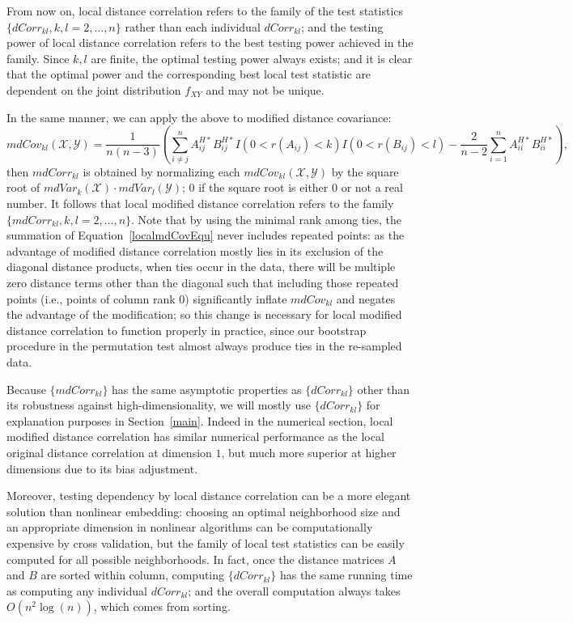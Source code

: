 \documentclass[11pt]{article}
\begin{document}
From now on, local distance correlation refers to the family of the test statistics $\{dCorr_{kl}, k,l=2,\ldots,n\}$ rather than each individual $dCorr_{kl}$; and the testing power of local distance correlation refers to the best testing power achieved in the family. Since $k,l$ are finite, the optimal testing power always exists; and it is clear that the optimal power and the corresponding best local test statistic are dependent on the joint distribution $f_{XY}$ and may not be unique.

In the same manner, we can apply the above to modified distance covariance:
\begin{equation}
\label{localmdCovEqu}
mdCov_{kl}(\mathcal{X},\mathcal{Y}) =\frac{1}{n(n-3)}(\sum_{i \neq j}^{n}A^{H*}_{ij}B^{H*}_{ij}I(0<r(A_{ij})<k)I(0<r(B_{ij})<l)-\frac{2}{n-2}\sum_{i=1}^{n}A^{H*}_{ii}B^{H*}_{ii}), 
\end{equation}
then $mdCorr_{kl}$ is obtained by normalizing each $mdCov_{kl}(\mathcal{X},\mathcal{Y})$ by the square root of $mdVar_{k}(\mathcal{X}) \cdot mdVar_{l}(\mathcal{Y})$; $0$ if the square root is either $0$ or not a real number. It follows that local modified distance correlation refers to the family $\{mdCorr_{kl}, k,l=2,\ldots,n\}$. Note that by using the minimal rank among ties, the summation of Equation~\eqref{localmdCovEqu} never includes repeated points: as the advantage of modified distance correlation mostly lies in its exclusion of the diagonal distance products, when ties occur in the data, there will be multiple zero distance terms other than the diagonal such that including those repeated points (i.e., points of column rank $0$) significantly inflate $mdCov_{kl}$ and negates the advantage of the modification; so this change is necessary for local modified distance correlation to function properly in practice, since our bootstrap procedure in the permutation test almost always produce ties in the re-sampled data.

Because $\{mdCorr_{kl}\}$ has the same asymptotic properties as $\{dCorr_{kl}\}$ other than its robustness against high-dimensionality, we will mostly use $\{dCorr_{kl}\}$ for explanation purposes in Section~\ref{main}. Indeed in the numerical section, local modified distance correlation has similar numerical performance as the local original distance correlation at dimension $1$, but much more superior at higher dimensions due to its bias adjustment.


Moreover, testing dependency by local distance correlation can be a more elegant solution than nonlinear embedding: choosing an optimal neighborhood size and an appropriate dimension in nonlinear algorithms can be computationally expensive by cross validation, but the family of local test statistics can be easily computed for all possible neighborhoods. In fact, once the distance matrices $A$ and $B$ are sorted within column, computing $\{dCorr_{kl}\}$ has the same running time as computing any individual $dCorr_{kl}$; and the overall computation always takes $O(n^2 \log(n))$, which comes from sorting. 
\end{document}
